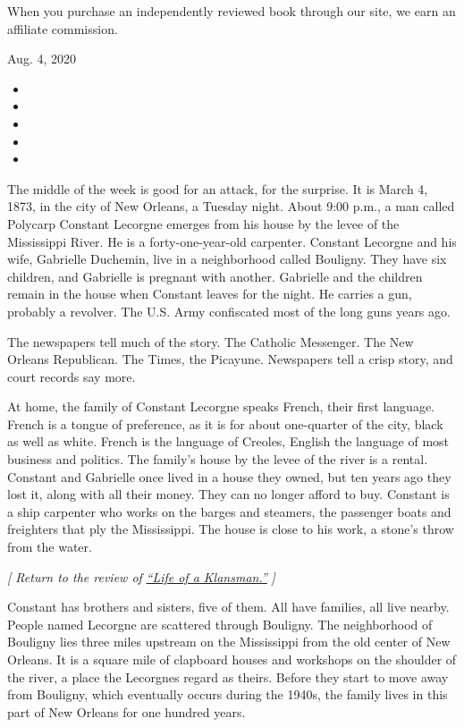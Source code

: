 When you purchase an independently reviewed book through our site, we
earn an affiliate commission.

Aug. 4, 2020

\begin{itemize}
\item
\item
\item
\item
\item
\end{itemize}

The middle of the week is good for an attack, for the surprise. It is
March 4, 1873, in the city of New Orleans, a Tuesday night. About 9:00
p.m., a man called Polycarp Constant Lecorgne emerges from his house by
the levee of the Mississippi River. He is a forty-one-year-old
carpenter. Constant Lecorgne and his wife, Gabrielle Duchemin, live in a
neighborhood called Bouligny. They have six children, and Gabrielle is
pregnant with another. Gabrielle and the children remain in the house
when Constant leaves for the night. He carries a gun, probably a
revolver. The U.S. Army confiscated most of the long guns years ago.

The newspapers tell much of the story. The Catholic Messenger. The New
Orleans Republican. The Times, the Picayune. Newspapers tell a crisp
story, and court records say more.

At home, the family of Constant Lecorgne speaks French, their first
language. French is a tongue of preference, as it is for about
one-quarter of the city, black as well as white. French is the language
of Creoles, English the language of most business and politics. The
family's house by the levee of the river is a rental. Constant and
Gabrielle once lived in a house they owned, but ten years ago they lost
it, along with all their money. They can no longer afford to buy.
Constant is a ship carpenter who works on the barges and steamers, the
passenger boats and freighters that ply the Mississippi. The house is
close to his work, a stone's throw from the water.

\emph{{[} Return to the review of}
\href{https://www.nytimes3xbfgragh.onion/2020/08/04/books/review/life-of-a-klansman-edward-ball.html}{\emph{``Life
of a Klansman.''}} \emph{{]}}

Constant has brothers and sisters, five of them. All have families, all
live nearby. People named Lecorgne are scattered through Bouligny. The
neighborhood of Bouligny lies three miles upstream on the Mississippi
from the old center of New Orleans. It is a square mile of clapboard
houses and workshops on the shoulder of the river, a place the Lecorgnes
regard as theirs. Before they start to move away from Bouligny, which
eventually occurs during the 1940s, the family lives in this part of New
Orleans for one hundred years.

